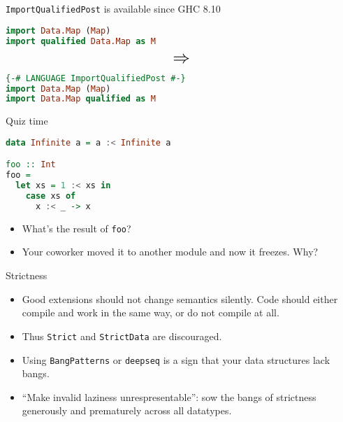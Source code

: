 \documentclass[handout]{beamer}
\begin{document}
\begin{frame}[fragile]{{\tt ImportQualifiedPost} is available since GHC 8.10}

\begin{lstlisting}[language=Haskell]
import Data.Map (Map)
import qualified Data.Map as M
\end{lstlisting}

\pause

$$
\mathlarger{\mathlarger{\mathlarger{\Rightarrow}}}
$$

\begin{lstlisting}[language=Haskell]
{-# LANGUAGE ImportQualifiedPost #-}
import Data.Map (Map)
import Data.Map qualified as M
\end{lstlisting}

\end{frame}

\begin{frame}[fragile]{Quiz time}

\begin{lstlisting}[language=Haskell]
data Infinite a = a :< Infinite a

foo :: Int
foo =
  let xs = 1 :< xs in
    case xs of
      x :< _ -> x
\end{lstlisting}

\bigskip
\bigskip

\begin{itemize}[<+->]
  \item What's the result of {\tt foo}?
  \item Your coworker moved it to another module and now it freezes. Why?
\end{itemize}

\end{frame}

\begin{frame}{Strictness}

\begin{itemize}[<+->]\itemsep3ex
  \item Good extensions should not change semantics silently.
        Code should either compile and work in the same way,
        or do not compile at all.
  \item Thus {\tt Strict} and {\tt StrictData} are discouraged.
  \item Using {\tt BangPatterns} or {\tt deepseq} is a sign that your
        data structures lack bangs.
  \item ``Make invalid laziness unrespresentable'':
        sow the bangs of strictness generously and prematurely
        across all datatypes.
\end{itemize}

\end{frame}
\end{document}
